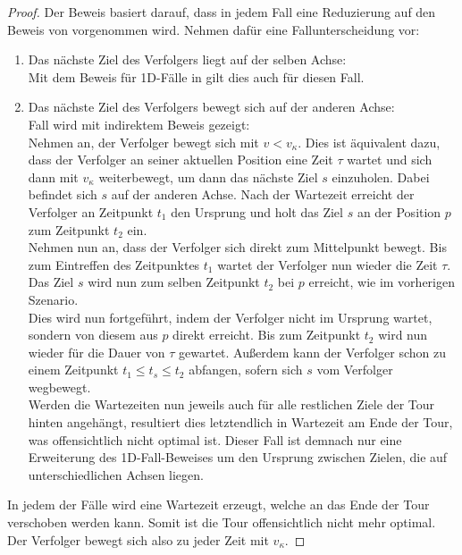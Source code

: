 \documentclass[german,version-2019-11]{uzl-thesis}
\begin{document}
\begin{proof}
Der Beweis basiert darauf, dass in jedem Fall eine Reduzierung auf den Beweis von \cite{helvig} vorgenommen wird. Nehmen dafür eine Fallunterscheidung vor:
\begin{enumerate}
\item Das nächste Ziel des Verfolgers liegt auf der selben Achse: \\
Mit dem Beweis für 1D-Fälle in \cite{helvig} gilt dies auch für diesen Fall.

\item Das nächste Ziel des Verfolgers bewegt sich auf der anderen Achse: \\
Fall wird mit indirektem Beweis gezeigt: \\
Nehmen an, der Verfolger bewegt sich mit $v < v_{\kappa}$. Dies ist äquivalent dazu, dass der Verfolger an seiner aktuellen Position eine Zeit $\tau$ wartet und sich dann mit $v_{\kappa}$ weiterbewegt, um dann das nächste Ziel $s$ einzuholen. Dabei befindet sich $s$ auf der anderen Achse. Nach der Wartezeit erreicht der Verfolger an Zeitpunkt $t_1$ den Ursprung und holt das Ziel $s$ an der Position $p$ zum Zeitpunkt $t_2$ ein. \\
Nehmen nun an, dass der Verfolger sich direkt zum Mittelpunkt bewegt. Bis zum Eintreffen des Zeitpunktes $t_1$ wartet der Verfolger nun wieder die Zeit $\tau$. Das Ziel $s$ wird nun zum selben Zeitpunkt $t_2$ bei $p$ erreicht, wie im vorherigen Szenario. \\
Dies wird nun fortgeführt, indem der Verfolger nicht im Ursprung wartet, sondern von diesem aus $p$ direkt erreicht. Bis zum Zeitpunkt $t_2$ wird nun wieder für die Dauer von $\tau$ gewartet. Außerdem kann der Verfolger schon zu einem Zeitpunkt $t_1 \leq t_{s} \leq t_2$ abfangen, sofern sich $s$ vom Verfolger wegbewegt. \\
Werden die Wartezeiten nun jeweils auch für alle restlichen Ziele der Tour hinten angehängt, resultiert dies letztendlich in Wartezeit am Ende der Tour, was offensichtlich nicht optimal ist. Dieser Fall ist demnach nur eine Erweiterung des 1D-Fall-Beweises um den Ursprung zwischen Zielen, die auf unterschiedlichen Achsen liegen. 
\end{enumerate}\noindent
In jedem der Fälle wird eine Wartezeit erzeugt, welche an das Ende der Tour \\verschoben werden kann. Somit ist die Tour offensichtlich nicht mehr optimal. Der Verfolger bewegt sich also zu jeder Zeit mit $v_{\kappa}$.
\end{proof}
\end{document}
